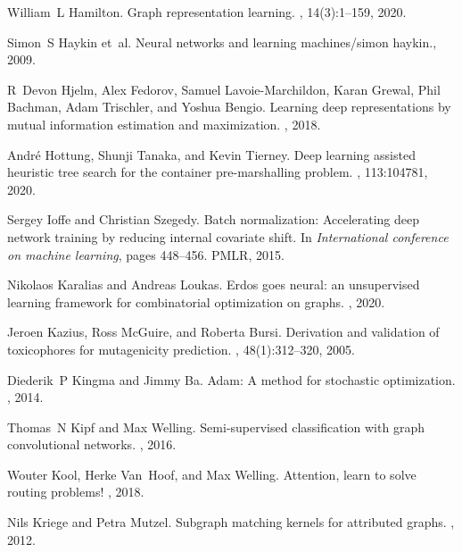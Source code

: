 \documentclass{article}
\begin{document}
\begin{thebibliography}{999}
	William~L Hamilton.
	\newblock Graph representation learning.
	, 14(3):1--159, 2020.
	
	Simon~S Haykin et~al.
	\newblock Neural networks and learning machines/simon haykin., 2009.
	
	R~Devon Hjelm, Alex Fedorov, Samuel Lavoie-Marchildon, Karan Grewal, Phil
	Bachman, Adam Trischler, and Yoshua Bengio.
	\newblock Learning deep representations by mutual information estimation and
	maximization.
	, 2018.
	
	Andr{\'e} Hottung, Shunji Tanaka, and Kevin Tierney.
	\newblock Deep learning assisted heuristic tree search for the container
	pre-marshalling problem.
	, 113:104781, 2020.
	
	Sergey Ioffe and Christian Szegedy.
	\newblock Batch normalization: Accelerating deep network training by reducing
	internal covariate shift.
	\newblock In {\em International conference on machine learning}, pages
	448--456. PMLR, 2015.
	
	Nikolaos Karalias and Andreas Loukas.
	\newblock Erdos goes neural: an unsupervised learning framework for
	combinatorial optimization on graphs.
	, 2020.
	
	Jeroen Kazius, Ross McGuire, and Roberta Bursi.
	\newblock Derivation and validation of toxicophores for mutagenicity
	prediction.
	, 48(1):312--320, 2005.
	
	Diederik~P Kingma and Jimmy Ba.
	\newblock Adam: A method for stochastic optimization.
	, 2014.
	
	Thomas~N Kipf and Max Welling.
	\newblock Semi-supervised classification with graph convolutional networks.
	, 2016.
	
	Wouter Kool, Herke Van~Hoof, and Max Welling.
	\newblock Attention, learn to solve routing problems!
	, 2018.
	
	Nils Kriege and Petra Mutzel.
	\newblock Subgraph matching kernels for attributed graphs.
	, 2012.
	

\end{thebibliography}
\end{document}
